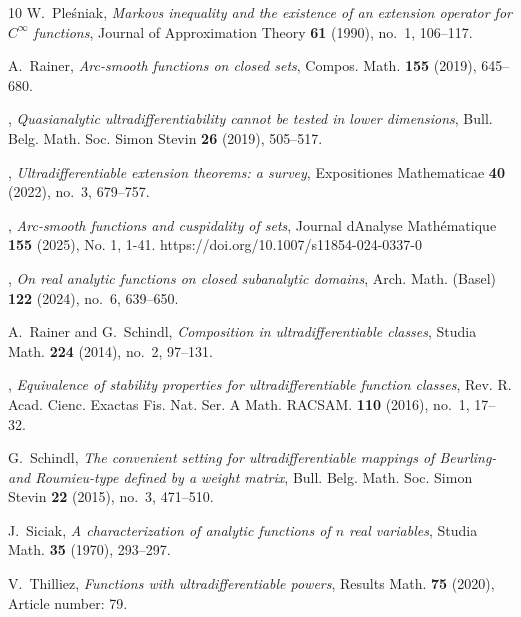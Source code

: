\documentclass[10pt, reqno]{amsart}
\theoremstyle{plain}
\theoremstyle{definition}
\numberwithin{equation}{section}
\begin{document}
\begin{thebibliography}{10}
    W.~Ple{\'{s}}niak, \emph{{Markov{\textquotesingle}s inequality and the existence of an extension operator for $C^\infty$ functions}}, Journal of Approximation Theory \textbf{61} (1990), no.~1, 106--117.

    A.~Rainer, \emph{Arc-smooth functions on closed sets}, Compos. Math. \textbf{155} (2019), 645--680.

    \bysame, \emph{Quasianalytic ultradifferentiability cannot be tested in lower dimensions}, Bull. Belg. Math. Soc. Simon Stevin \textbf{26} (2019), 505--517.

    \bysame, \emph{Ultradifferentiable extension theorems: a survey}, Expositiones Mathematicae \textbf{40} (2022), no.~3, 679--757. %

    \bysame, \emph{Arc-smooth functions and cuspidality of sets}, Journal d{\textquotesingle}Analyse Math{\'{e}}matique \textbf{155} (2025), No. 1, 1-41. https://doi.org/10.1007/s11854-024-0337-0 

    \bysame, \emph{On real analytic functions on closed subanalytic domains}, Arch. Math. (Basel) \textbf{122} (2024), no.~6, 639--650. %

    A.~Rainer and G.~Schindl, \emph{Composition in ultradifferentiable classes}, Studia Math. \textbf{224} (2014), no.~2, 97--131.

    \bysame, \emph{Equivalence of stability properties for ultradifferentiable function classes}, Rev. R. Acad. Cienc. Exactas Fis. Nat. Ser. A Math. RACSAM. \textbf{110} (2016), no.~1, 17--32.

    G.~Schindl, \emph{The convenient setting for ultradifferentiable mappings of {B}eurling- and {R}oumieu-type defined by a weight matrix}, Bull. Belg. Math. Soc. Simon Stevin \textbf{22} (2015), no.~3, 471--510. 

    J.~Siciak, \emph{A characterization of analytic functions of {$n$} real variables}, Studia Math. \textbf{35} (1970), 293--297.

    V.~Thilliez, \emph{Functions with ultradifferentiable powers}, Results Math. \textbf{75} (2020), Article number: 79. %

\end{thebibliography}


    
\end{document}
